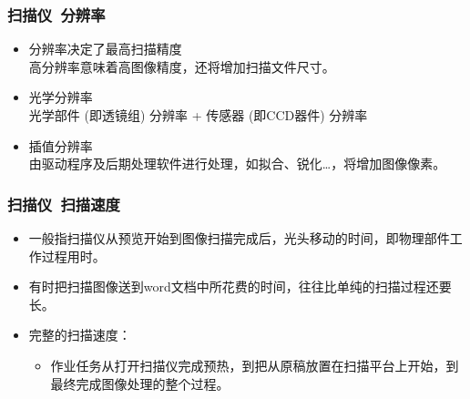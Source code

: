 \documentclass{beamer}
\begin{document}
\begin{frame}
	\frametitle{扫描仪~{\small 分辨率}}
	\beamertemplatetransparentcovereddynamicmedium
	\begin{itemize}[<+->]
		\item 分辨率决定了最高扫描精度\\{\tiny 高分辨率意味着高图像精度，还将增加扫描文件尺寸。}
		\item 光学分辨率\\{\tiny 光学部件 (即透镜组) 分辨率 + 传感器 (即CCD器件) 分辨率}
		\item 插值分辨率\\{\tiny 由驱动程序及后期处理软件进行处理，如拟合、锐化\dots ，将增加图像像素。}
	\end{itemize}
\end{frame}

\begin{frame}
	\frametitle{扫描仪~{\small 扫描速度}}
	\beamertemplatetransparentcovereddynamicmedium
	\begin{itemize}[<+->]
		\item 一般指扫描仪从预览开始到图像扫描完成后，光头移动的时间，即物理部件工作过程用时。
		\item 有时把扫描图像送到word文档中所花费的时间，往往比单纯的扫描过程还要长。
		\item 完整的扫描速度：
		\begin{itemize}
			\item 作业任务从打开扫描仪完成预热，到把从原稿放置在扫描平台上开始，到最终完成图像处理的整个过程。
		\end{itemize}
	\end{itemize}
\end{frame}
\end{document}
